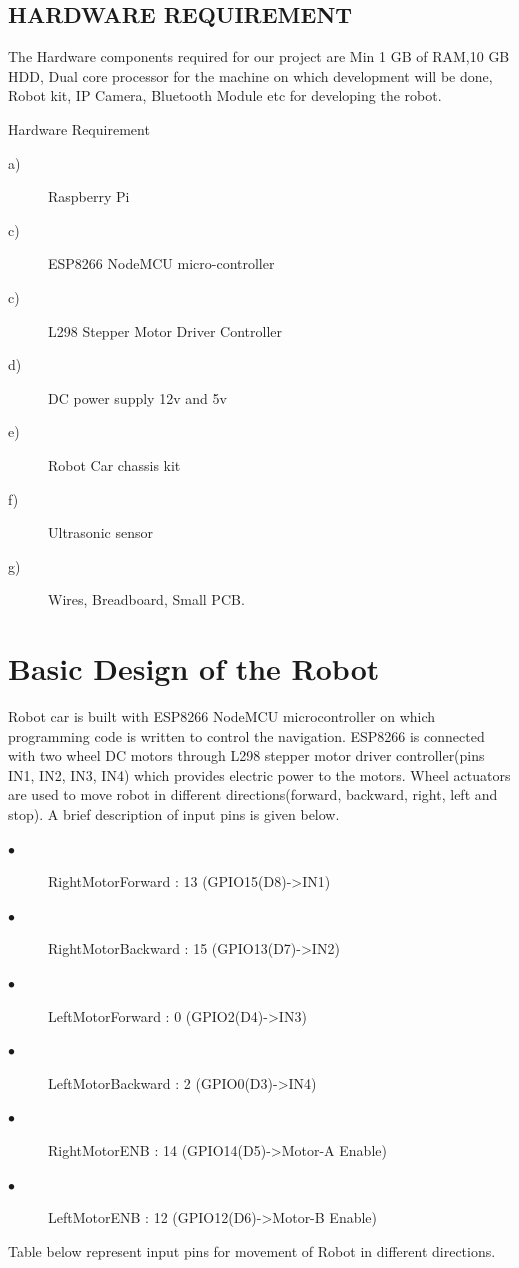 \documentclass[sigconf]{acmart}
\begin{document}
\subsection{HARDWARE REQUIREMENT}
The Hardware components required for our project are Min 1 GB of RAM,10 GB HDD, Dual core processor for the machine on which development will be done, Robot kit, IP Camera, Bluetooth Module etc for developing the robot.

Hardware Requirement
\begin{description}
\item[a)] Raspberry Pi
\item[c)] ESP8266 NodeMCU micro-controller
\item[c)] L298 Stepper Motor Driver Controller
\item[d)] DC power supply 12v and 5v
\item[e)] Robot Car chassis kit
\item[f)] Ultrasonic sensor
\item[g)] Wires, Breadboard, Small PCB.
\end{description}

\section{Basic Design of the Robot}
Robot car is built with ESP8266 NodeMCU microcontroller on which programming code is written to control the navigation. ESP8266 is connected with two wheel DC motors through L298 stepper motor driver controller(pins IN1, IN2, IN3, IN4) which provides electric power to the motors. Wheel actuators are used to move robot in different directions(forward, backward, right, left and stop).
A brief description of input pins is given below.
\begin{description}
    \item[$\bullet$] RightMotorForward  : 13  (GPIO15(D8)->IN1)
    \item[$\bullet$] RightMotorBackward : 15 (GPIO13(D7)->IN2)
    \item[$\bullet$] LeftMotorForward   : 0    (GPIO2(D4)->IN3)
    \item[$\bullet$] LeftMotorBackward  : 2   (GPIO0(D3)->IN4)
    \item[$\bullet$] RightMotorENB      : 14 (GPIO14(D5)->Motor-A Enable)
    \item[$\bullet$] LeftMotorENB       : 12  (GPIO12(D6)->Motor-B Enable)
\end{description}

Table below represent input pins for movement of Robot in different directions.
\end{document}
